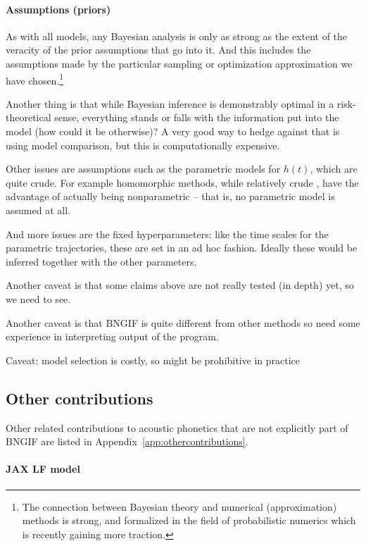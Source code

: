 \begin{chaptersections}
\paragraph{Assumptions (priors)}
As with all models, any Bayesian analysis is only as strong as the extent of the veracity of the prior assumptions that go into it.
And this includes the assumptions made by the particular sampling or optimization approximation we have chosen.\footnote{%
The connection between Bayesian theory and numerical (approximation) methods is strong, and formalized in the field of probabilistic numerics \citep{Hennig2022} which is recently gaining more traction.
}

Another thing is that while Bayesian inference is demonstrably optimal in a risk-theoretical sense, everything stands or falls with the information put into the model (how could it be otherwise)?
A very good way to hedge against that is using model comparison, but this is computationally expensive.



Other issues are assumptions such as the parametric models for $h(t)$, which are quite crude.
For example homomorphic methods, while relatively crude \citep{Chien2017}, have the advantage of actually being nonparametric -- that is, no parametric model is assumed at all.

And more issues are the fixed hyperparameters: like the time scales for the parametric trajectories, these are set in an ad hoc fashion.
Ideally these would be inferred together with the other parameters.

Another caveat is that some claims above are not really tested (in depth) yet, so we need to see.

Another caveat is that BNGIF is quite different from other methods so need some experience in interpreting output of the program.

Caveat: model selection is costly, so might be prohibitive in practice


\subsection{Other contributions}

Other related contributions to acoustic phonetics that are not explicitly part of BNGIF are listed in Appendix~\ref{app:othercontributions}.

\paragraph{JAX LF model}


\end{chaptersections}
